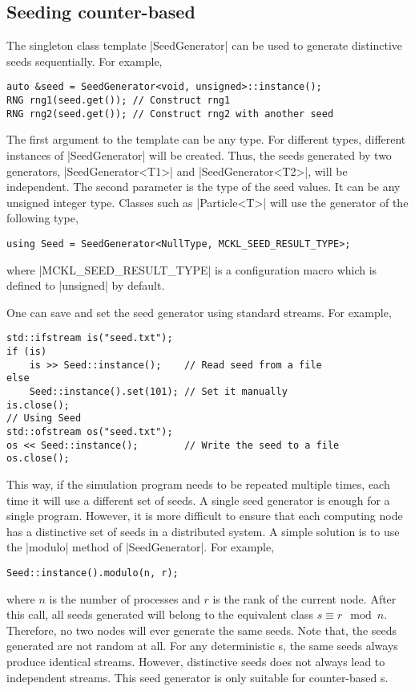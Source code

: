 \subsection{Seeding counter-based \texorpdfstring{\protect\rng}{RNG}}
\label{sub:Seeding counter-based RNG}

The singleton class template |SeedGenerator| can be used to generate
distinctive seeds sequentially. For example,
\begin{Verbatim}
auto &seed = SeedGenerator<void, unsigned>::instance();
RNG rng1(seed.get()); // Construct rng1
RNG rng2(seed.get()); // Construct rng2 with another seed
\end{Verbatim}
The first argument to the template can be any type. For different types,
different instances of |SeedGenerator| will be created. Thus, the seeds
generated by two generators, |SeedGenerator<T1>| and |SeedGenerator<T2>|, will
be independent. The second parameter is the type of the seed values. It can be
any unsigned integer type. Classes such as |Particle<T>| will use the generator
of the following type,
\begin{Verbatim}
using Seed = SeedGenerator<NullType, MCKL_SEED_RESULT_TYPE>;
\end{Verbatim}
where |MCKL_SEED_RESULT_TYPE| is a configuration macro which is defined to
|unsigned| by default.

One can save and set the seed generator using standard streams. For example,
\begin{Verbatim}
std::ifstream is("seed.txt");
if (is)
    is >> Seed::instance();    // Read seed from a file
else
    Seed::instance().set(101); // Set it manually
is.close();
// Using Seed
std::ofstream os("seed.txt");
os << Seed::instance();        // Write the seed to a file
os.close();
\end{Verbatim}
This way, if the simulation program needs to be repeated multiple times, each
time it will use a different set of seeds. A single seed generator is enough
for a single program. However, it is more difficult to ensure that each
computing node has a distinctive set of seeds in a distributed system. A simple
solution is to use the |modulo| method of |SeedGenerator|. For example,
\begin{Verbatim}
Seed::instance().modulo(n, r);
\end{Verbatim}
where $n$ is the number of processes and $r$ is the rank of the current node.
After this call, all seeds generated will belong to the equivalent class $s
\equiv r \mod n$. Therefore, no two nodes will ever generate the same seeds.
Note that, the seeds generated are not random at all. For any deterministic
\rng{}s, the same seeds always produce identical streams. However, distinctive
seeds does not always lead to independent streams. This seed generator is only
suitable for counter-based \rng{}s.

